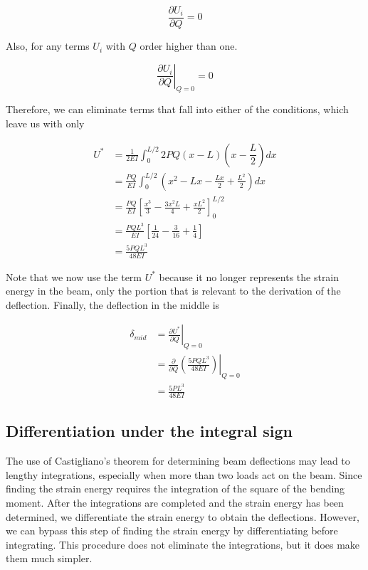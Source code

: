 \documentclass[
10pt,
a4paper,
openany,
svgnames,
]{kaobook} %
\begin{document}
\begin{solution}
    \begin{equation*}
      \frac{\partial U_i}{\partial Q} = 0
    \end{equation*}

    Also, for any terms $U_i$ with $Q$ order higher than one.

    \begin{equation*}
      \left. \frac{\partial U_i}{\partial Q} \right|_{Q=0} = 0
    \end{equation*}

    Therefore, we can eliminate terms that fall into either of the conditions, which leave us with only

    \begin{align*}
      U^* &= \frac{1}{2EI} \int_0^{L/2} 2PQ(x-L)(x-\dfrac{L}{2}) dx \\
          &= \frac{PQ}{EI} \int_0^{L/2} (x^2 - Lx - \frac{Lx}{2} + \frac{L^2}{2}) dx \\
          &= \frac{PQ}{EI} \left[ \frac{x^3}{3} - \frac{3x^2L}{4} + \frac{xL^2}{2} \right]_0^{L/2} \\
          &= \frac{PQL^3}{EI} \left[ \frac{1}{24} - \frac{3}{16} + \frac{1}{4} \right] \\
          &= \frac{5PQL^3}{48EI}
    \end{align*}

    Note that we now use the term $U^*$ because it no longer represents the strain energy in the beam, only the portion that is relevant to the derivation of the deflection. Finally, the deflection in the middle is

    \begin{align*}
      \delta_{mid} &= \left. \frac{\partial U^*}{\partial Q} \right|_{Q=0} \\
                   &= \left. \frac{\partial}{\partial Q} \left( \frac{5PQL^3}{48EI} \right) \right|_{Q=0} \\
                   &= \frac{5PL^3}{48EI}
    \end{align*}
\end{solution}
\subsection{Differentiation under the integral sign}

The use of Castigliano’s theorem for determining beam deflections may lead to lengthy integrations, especially when more than two loads act on the beam. Since finding the strain energy requires the integration of the square of the bending moment. After the integrations are completed and the strain energy has been determined, we differentiate the strain energy to obtain the deflections. However, we can bypass this step of finding the strain energy by differentiating before integrating. This procedure does not eliminate the integrations, but it does make them much simpler.
\end{document}
